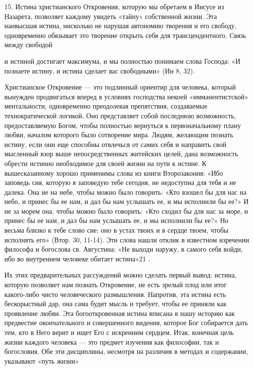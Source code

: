 \documentclass[a5paper,10pt]{article}
\begin{document}
15. Истина христианского Откровения, которую мы обретаем в Иисусе из Назарета,
позволяет каждому увидеть «тайну» собственной жизни. Эта наивысшая истина,
нисколько не нарушая автономию творения и его свободу, одновременно обязывает
это творение открыть себя для трансцендентного. Связь между свободой

и истиной достигает максимума, и мы полностью понимаем слова Господа: «И
познаете истину, и истина сделает вас свободными» (Ин 8, 32).

Христианское Откровение — это подлинный ориентир для человека, который вынужден
продвигаться вперед в условиях господства некоей «имманентистской»
ментальности, одновременно преодолевая препятствия, создаваемые
технократической логикой. Оно представляет собой последнюю возможность,
предоставляемую Богом, чтобы полностью вернуться к первоначальному плану любви,
началом которого было сотворение мира. Людям, желающим познать истину, если они
еще способны отвлечься от самих себя и направить свой мысленный взор выше
непосредственных житейских целей, дана возможность обрести истинно необходимое
для своей жизни на пути к истине. К вышесказанному хорошо применимы слова из
книги Второзакония: «Ибо заповедь сия, которую я заповедую тебе сегодня, не
недоступна для тебя и не далека. Она не на небе, чтобы можно было говорить:
«Кто взошел бы для нас на небо, и принес бы ее нам, и дал бы нам услышать ее, и
мы исполнили бы ее?» И не за морем она, чтобы можно было говорить: «Кто сходил
бы для нас за море, и принес бы ее нам, и дал бы нам услышать ее, и мы
исполнили бы ее?» Но весьма близко к тебе слово сие; оно в устах твоих и в
сердце твоем, чтобы исполнять его» (Втор. 30, 11-14). Эти слова нашли отклик в
известном изречении философа и богослова св. Августина: «Не выходи наружу, в
самого себя войди, ибо во внутреннем человеке обитает истина»21 .

Их этих предварительных рассуждений можно сделать первый вывод: истина, которую
позволяет нам познать Откровение, не есть зрелый плод или итог какого-либо
чисто человеческого размышления. Напротив, эта истина есть бескорыстный дар,
она сама будит мысль и требует, чтобы ее приняли как проявление любви. Эта
богооткровенная истина вписана в нашу историю как предвестие окончательного и
совершенного видения, которое Бог собирается дать тем, кто в Него верит и ищет
Его с искренним сердцем. Итак, конечная цель жизни каждого человека — это
предмет изучения как философии, так и богословия. Обе эти дисциплины, несмотря
на различия в методах и содержании, указывают «путь жизни»
\end{document}
